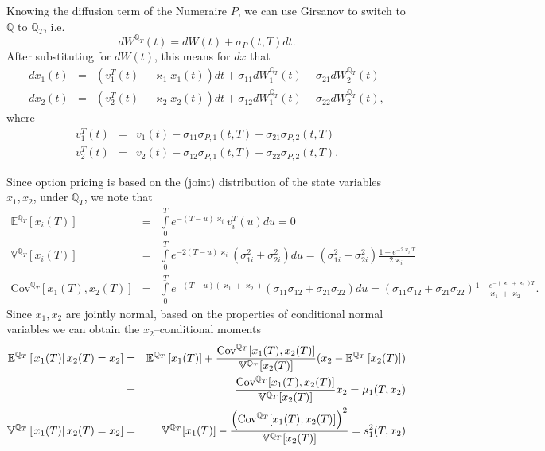 \documentclass[11pt,a4paper]{article}
\theoremstyle{break} %
\numberwithin{equation}{section}
\begin{document}
Knowing the diffusion term of the Numeraire $P$, we can use Girsanov to switch to $\mathbb{Q}$ to $\mathbb{Q}_T$, i.e.
\begin{equation*}
  d{W^{{\mathbb{Q}_T}}}(t) = dW(t) + {\sigma _P}(t,T)dt.
\end{equation*}
After substituting for $dW(t)$, this means for $dx$ that
\begin{eqnarray*}
d{x_1}(t) &=& \left( {v_1^T(t) - {\varkappa_1}{x_1}(t)} \right)dt + {\sigma _{11}}dW_1^{{\mathbb{Q}_T}}(t) + {\sigma _{21}}dW_2^{{\mathbb{Q}_T}}(t)\\
d{x_2}(t) &=& \left( {v_2^T(t) - {\varkappa_2}{x_2}(t)} \right)dt + {\sigma _{12}}dW_1^{{\mathbb{Q}_T}}(t) + {\sigma _{22}}dW_2^{{\mathbb{Q}_T}}(t),
\end{eqnarray*}
where 
\begin{eqnarray*}
v_1^T(t) &=& {v_1}(t) - {\sigma _{11}}{\sigma _{P,1}}(t,T) - {\sigma _{21}}{\sigma _{P,2}}(t,T)\\
v_2^T(t) &=& {v_2}(t) - {\sigma _{12}}{\sigma _{P,1}}(t,T) - {\sigma _{22}}{\sigma _{P,2}}(t,T).
\end{eqnarray*}

Since option pricing is based on the (joint) distribution of the state variables $x_1, x_2$, under $\mathbb{Q}_T$, we note that 
\begin{eqnarray*}
{\mathbb{E}^{{\mathbb{Q}_T}}}[{x_i}(T)] &=& \int\limits_0^T {{e^{ - (T - u){\varkappa_i}}}v_i^T(u)du}  = 0\\
{\mathbb{V}^{{\mathbb{Q}_T}}}[{x_i}(T)] &=& \int\limits_0^T {{e^{ - 2(T - u){\varkappa_i}}}(\sigma _{1i}^2 + \sigma _{2i}^2)du}  = (\sigma _{1i}^2 + \sigma _{2i}^2)\frac{{1 - {e^{ - 2{\varkappa_i}T}}}}{{2{\varkappa_i}}}\\
\text{Cov}^{{\mathbb{Q}_T}}[{x_1}(T),{x_2}(T)] &=& \int\limits_0^T {{e^{ - (T - u)({\varkappa_1} + {\varkappa_2})}}({\sigma _{11}}{\sigma _{12}} + {\sigma _{21}}{\sigma _{22}})du}  = ({\sigma _{11}}{\sigma _{12}} + {\sigma _{21}}{\sigma _{22}})\frac{{1 - {e^{ - ({\varkappa_1} + {\varkappa_2})T}}}}{{{\varkappa_1} + {\varkappa_2}}}.
\end{eqnarray*}
Since $x_1, x_2$ are jointly normal, based on the properties of conditional normal variables we can obtain the $x_2$--conditional moments
\begin{eqnarray*}
  {\mathbb{E}^{{\mathbb{Q}_T}}}\left[ {\left. {{x_1}(T)} \right|{x_2}(T) = {x_2}} \right] &=& {\mathbb{E}^{{\mathbb{Q}_T}}}\left[ {{x_1}(T)} \right] + \frac{{\text{Cov}^{{\mathbb{Q}_T}}[{x_1}(T),{x_2}(T)]}}{{{\mathbb{V}^{{\mathbb{Q}_T}}}[{x_2}(T)]}}({x_2} - {\mathbb{E}^{{\mathbb{Q}_T}}}\left[ {{x_2}(T)} \right])\\
   &=& \frac{{{\rm{Co}}{{\rm{v}}^{{\mathbb{Q}_T}}}[{x_1}(T),{x_2}(T)]}}{{{\mathbb{V}^{{\mathbb{Q}_T}}}[{x_2}(T)]}}{x_2} = {\mu _1}(T,{x_2})\\
   {\mathbb{V}^{{\mathbb{Q}_T}}}\left[ {\left. {{x_1}(T)} \right|{x_2}(T) = {x_2}} \right] &=& {\mathbb{V}^{{\mathbb{Q}_T}}}[{x_1}(T)] - \frac{{{{\left( {\text{Cov}^{{\mathbb{Q}_T}}[{x_1}(T),{x_2}(T)]} \right)}^2}}}{{{\mathbb{V}^{{\mathbb{Q}_T}}}[{x_2}(T)]}} = s_1^2(T,{x_2})
\end{eqnarray*}
\end{document}
